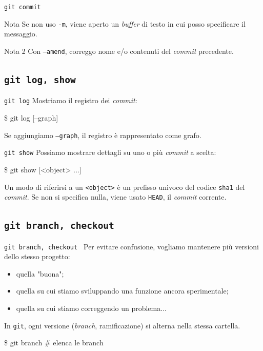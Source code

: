 \documentclass{beamer}
\begin{document}
\begin{frame}{\texttt{git commit}}
  \begin{block}{Nota}
    Se non uso \texttt{-m}, viene aperto un \emph{buffer} di testo in cui posso
    specificare il messaggio.
  \end{block}
  \begin{block}{Nota 2}
    Con \texttt{--amend}, correggo nome e/o contenuti del \emph{commit}
    precedente.
  \end{block}
\end{frame}
\subsection{\texttt{git log, show}}
\begin{frame}{\texttt{git log}}
  Mostriamo il registro dei \emph{commit}:
  \begin{semiverbatim}
    \$ git log [--graph]
  \end{semiverbatim}
  Se aggiungiamo \texttt{--graph}, il registro è rappresentato come grafo.
\end{frame}

\begin{frame}{\texttt{git show}}
  Possiamo mostrare dettagli su uno o più \emph{commit} a scelta:
  \begin{semiverbatim}
    \$ git show [<object> ...]
  \end{semiverbatim}
  Un modo di riferirsi a un \texttt{<object>} è un prefisso univoco del codice
  \texttt{sha1} del \emph{commit}. \pause Se non si specifica nulla, viene usato
  \texttt{HEAD}, il \emph{commit} corrente.
\end{frame}

\subsection{\texttt{git branch, checkout}}
\begin{frame}{\texttt{git branch, checkout }}
  Per evitare confusione, vogliamo mantenere più versioni dello stesso progetto:
  \begin{itemize}
    \item quella "buona";
    \item quella su cui stiamo sviluppando una funzione ancora sperimentale;
    \item quella su cui stiamo correggendo un problema...
  \end{itemize}\pause
  In \texttt{git}, ogni versione (\emph{branch}, ramificazione) si alterna
  nella stessa cartella.
  \begin{semiverbatim}
    \$ git branch \# elenca le branch
  \end{semiverbatim}
\end{frame}
\end{document}
